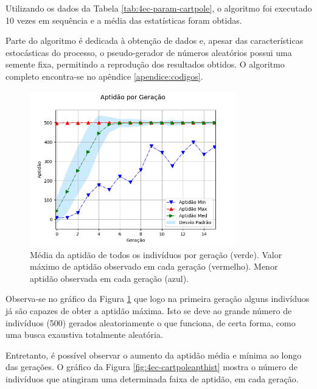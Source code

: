 Utilizando os dados da Tabela \ref{tab:4ec-param-cartpole}, o algoritmo foi executado 10 vezes em sequência e a média das estatísticas foram obtidas.

Parte do algoritmo é dedicada à obtenção de dados e, apesar das características estocásticas do processo, o pseudo-gerador de números aleatórios possui uma semente fixa, permitindo a reprodução dos resultados obtidos. O algoritmo completo encontra-se no apêndice \ref{apendice:codigos}.

\begin{figure}[H]
	\centering
	\includegraphics[width=0.8\textwidth]{02_desenvolvimento/04_EC_Fig_CartpoleAptGer.png}
	\caption{Média da aptidão de todos os indivíduos por geração (verde). Valor máximo de aptidão observado em cada geração (vermelho). Menor aptidão observada em cada geração (azul).}
	\label{fig:4ec-cartpoleaptger}
\end{figure}

Observa-se no gráfico da Figura \ref{fig:4ec-cartpoleaptger} que logo na primeira geração alguns indivíduos já são capazes de obter a aptidão máxima. Isto se deve ao grande número de indivíduos (500) gerados aleatoriamente o que funciona, de certa forma, como uma busca exaustiva totalmente aleatória.

Entretanto, é possível observar o aumento da aptidão média e mínima ao longo das gerações. O gráfico da Figura \ref{fig:4ec-cartpoleapthist} mostra o número de indivíduos que atingiram uma determinada faixa de aptidão, em cada geração.

